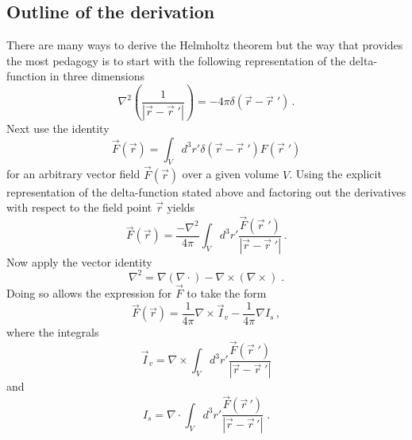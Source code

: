 \documentclass{article}
\begin{document}
\subsection{Outline of the derivation}
There are many ways to derive the Helmholtz theorem but the way that provides the most pedagogy is to start with 
the following representation of the delta-function in three dimensions 
\begin{equation}\label{delta}
    \nabla^2 \left( \frac{1}{|\vec r - \vec r \;'|} \right) = -4 \pi \delta( \vec r - \vec r \; ' ) \, .
\end{equation}
Next use the identity 
\begin{equation}
   \vec F(\vec r) = \int_{V} d^3 r' \delta(\vec r - \vec r \;') F(\vec r \; ')
\end{equation}
for an arbitrary vector field $\vec F(\vec r)$ over a given volume $V$.  Using the explicit representation of the 
delta-function stated above and factoring out the derivatives with respect to the field point $\vec r$ yields
\begin{equation}
   \vec F(\vec r) = \frac{ -\nabla^2 }{4 \pi} \int_V d^3 r' \frac{\vec F(\vec r\;')}{|\vec r - \vec r\;'|} \, .
\end{equation}
Now apply the vector identity
\begin{equation}
   \nabla^2 = \nabla ( \nabla \cdot ) - \nabla \times ( \nabla \times ) \; .
\end{equation}
Doing so allows the expression for $\vec F$ to take the form
\begin{equation}\label{Helm1}
  \vec F (\vec r) = \frac{1}{4 \pi} \nabla \times \vec I_{v} - \frac{1}{4 \pi} \nabla I_{s} \, ,
\end{equation}
where the integrals
\begin{equation}\label{Ivec}
  \vec I_{v} = \nabla \times \int_V d^3 r ' \frac{\vec F (\vec r\;')}{|\vec r - \vec r\;'|}
\end{equation}
and
\begin{equation}\label{Iscal}
  I_{s} = \nabla \cdot \int_V d^3 r ' \frac{\vec F (\vec r\,')}{|\vec r - \vec r\,'|} \; .
\end{equation}
\end{document}
